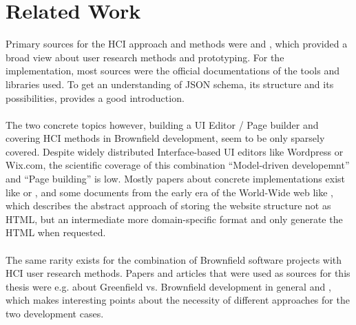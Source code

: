 \section{Related Work}

Primary sources for the HCI approach and methods were \cite{LearnHCI:2020ys} and \cite{Interactiondesign:2019ys}, which provided a broad view about user research methods and prototyping.
For the implementation, most sources were the official documentations of the tools and libraries used. To get an understanding of JSON schema, its structure and its possibilities, \cite{JsonSchema:2022ys} provides a good introduction.
\\\\
The two concrete topics however, building a UI Editor / Page builder and covering HCI methods in Brownfield development, seem to be only sparsely covered.
Despite widely distributed Interface-based UI editors like Wordpress or Wix.com, the scientific coverage of this combination ``Model-driven developemnt'' and ``Page building'' is low.
Mostly papers about concrete implementations exist like \cite{ServFaceBuilder:2009ys} or \cite{Harageones:2022}, and some documents from the early era of the World-Wide web like \cite{AutoWeb:2000ys}, which describes the abstract approach of storing the website
structure not as HTML, but an intermediate more domain-specific format and only generate the HTML when requested.
\\\\
The same rarity exists for the combination of Brownfield software projects with HCI user research methods.
Papers and articles that were used as sources for this thesis were e.g. \cite{JohnAdamsIt:Greenfield} about Greenfield vs. Brownfield development in general and \cite{BrownfieldToGreenfield:2021ys}, which makes interesting points about the necessity
of different approaches for the two development cases.
